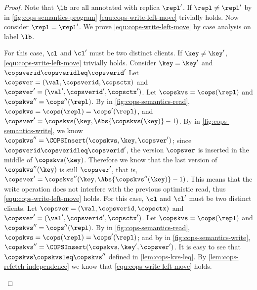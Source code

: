 \begin{proof}
Note that \( \lb \) are all annotated with replica \( \repl' \).
If \(\repl \neq \repl' \) 
by \rCOPSClient in \cref{fig:cops-semantics-program} \cref{equ:cops-write-left-move} trivially holds.
Now consider \( \repl = \repl' \).
We prove \cref{equ:cops-write-left-move} by case analysis on label \( \lb \).
\begin{enumerate}
    For this case, \( \cl \) and \( \cl' \) must be two distinct clients.
    If \( \key \neq \key' \), \cref{equ:cops-write-left-move} trivially holds.
    Consider \( \key = \key' \) and \( \copsverid \copsveridleq \copsverid' \) 
    Let \( \copsver = (\val,\copsverid, \copsctx ) \) and \( \copsver' = (\val',\copsverid', \copsctx' ) \).
    Let \( \copskvs = \cops(\repl) \) and \( \copskvs'' = \cops''(\repl) \).
    By \rCOPSOptRead in \cref{fig:cops-semantics-read}, \( \copskvs = \cops(\repl) = \cops'(\repl) \),
    and \( \copsver' = \copskvs(\key, \Abs{\copskvs(\key)} - 1 )\).
    By \rCOPSWrite in \cref{fig:cops-semantics-write}, we know \( \copskvs'' = \COPSInsert(\copskvs,\key,\copsver' ) \);
    since \( \copsverid \copsveridleq \copsverid' \), the version \( \copsver \)
    is inserted in the middle of \( \copskvs(\key) \).
    Therefore we know that the last version of \( \copskvs''(\key) \) is still \( \copsver' \),
    that is, \( \copsver' = \copskvs''(\key, \Abs{\copskvs''(\key)} - 1 ) \).
    This means that the write operation does not interfere with the previous optimistic read,
    thus \cref{equ:cops-write-left-move} holds.
    For this case, \( \cl \) and \( \cl' \) must be two distinct clients.
    Let \( \copsver = (\val,\copsverid, \copsctx ) \) and \( \copsver' = (\val',\copsverid', \copsctx' ) \).
    Let \( \copskvs = \cops(\repl) \) and \( \copskvs'' = \cops''(\repl) \).
    By \rCOPSRefetch in \cref{fig:cops-semantics-read}, \( \copskvs = \cops(\repl) = \cops'(\repl) \); 
    and by \rCOPSWrite in \cref{fig:cops-semantics-write}, \( \copskvs'' = \COPSInsert(\copskvs,\key',\copsver' ) \).
    It is easy to see that \( \copskvs \copskvsleq \copskvs'' \) defined in \cref{lem:cops-kvs-leq}.
    By \cref{lem:cops-refetch-independence} we know that \cref{equ:cops-write-left-move} holds.

\end{enumerate}
\end{proof}
